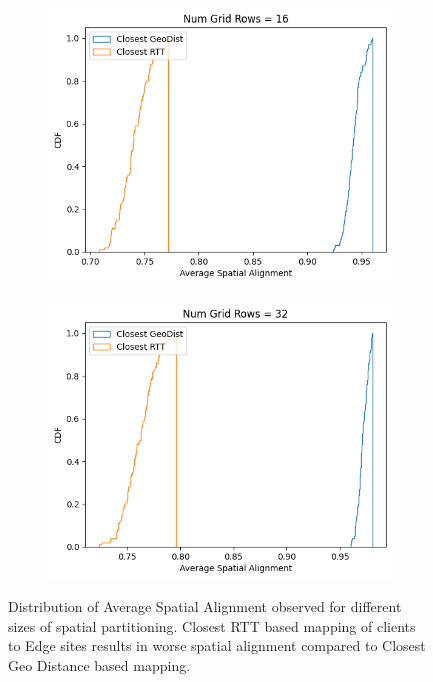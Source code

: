 \begin{figure}
\begin{subfigure}{0.45\textwidth}
  \centering
  \includegraphics[width=\linewidth]{figures/mechanisms/spatial_ctx_mgmt/spatial_alignment_randomized_16_rows.png}
  \caption{}
\end{subfigure}%
\begin{subfigure}{0.45\textwidth}
  \centering
  \includegraphics[width=\linewidth]{figures/mechanisms/spatial_ctx_mgmt/spatial_alignment_randomized_32_rows.png}
  \caption{}
\end{subfigure}
\caption{Distribution of Average Spatial Alignment observed for different sizes of spatial partitioning. Closest RTT based mapping of clients to Edge sites results in worse spatial alignment compared to Closest Geo Distance based mapping. }
\label{fig:spatial_alignment_eval}
\end{figure}

